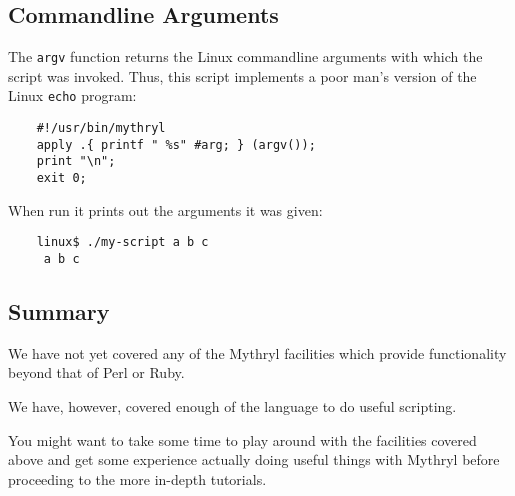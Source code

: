 \subsection{Commandline Arguments}

The {\tt argv} function returns the Linux commandline arguments with which the 
script was invoked.  Thus, this script implements a poor man's version of the 
Linux {\tt echo} program:

\begin{verbatim}
    #!/usr/bin/mythryl
    apply .{ printf " %s" #arg; } (argv());
    print "\n";
    exit 0;
\end{verbatim}

When run it prints out the arguments it was given:

\begin{verbatim}
    linux$ ./my-script a b c
     a b c
\end{verbatim}

\cutend*


\subsection{Summary}

We have not yet covered any of the Mythryl facilities which provide functionality 
beyond that of Perl or Ruby.

We have, however, covered enough of the language to do useful scripting.

You might want to take some time to play around with the facilities 
covered above and get some experience actually doing useful things 
with Mythryl before proceeding to the more in-depth tutorials.

\cutend*